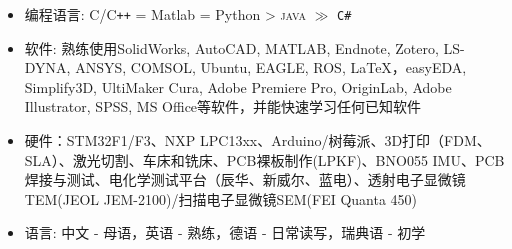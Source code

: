 
{}
\begin{itemize}[parsep=0.5ex]
  \item 编程语言: C/C\texttt{++} = Matlab = Python > \textsc{java} $\gg$ \texttt{C\#}
  \item 软件: 熟练使用SolidWorks, AutoCAD, MATLAB, Endnote, Zotero, LS-DYNA, ANSYS, COMSOL, Ubuntu, EAGLE, ROS, \LaTeX，easyEDA, Simplify3D, UltiMaker Cura, Adobe Premiere Pro, OriginLab, Adobe Illustrator, SPSS, MS Office等软件，并能快速学习任何已知软件
  \item 硬件：STM32F1/F3、NXP LPC13xx、Arduino/树莓派、3D打印（FDM、SLA）、激光切割、车床和铣床、PCB裸板制作(LPKF)、BNO055 IMU、PCB焊接与测试、电化学测试平台（辰华、新威尔、蓝电）、透射电子显微镜TEM(JEOL JEM-2100)/扫描电子显微镜SEM(FEI Quanta 450)
  \item 语言: 中文 - 母语，英语 - 熟练，德语 - 日常读写，瑞典语 - 初学
\end{itemize}


